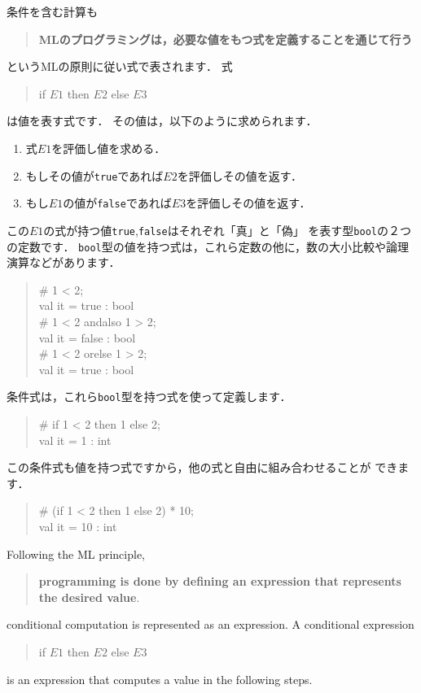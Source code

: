 \documentclass{jbook}
\newif\ifjp
\newenvironment{program}{\begin{quote}\begin{tt}}%
                        {\end{tt}\end{quote}}
\begin{document}
\ifjp%
	条件を含む計算も
\begin{quote}
{\bf MLのプログラミングは，必要な値をもつ式を定義することを通じて行う}
\end{quote}
というMLの原則に従い式で表されます．
	式
\begin{program}
if $E1$ then $E2$ else $E3$
\end{program}
は値を表す式です．
	その値は，以下のように求められます．
\begin{enumerate}
\item 式$E1$を評価し値を求める．
\item もしその値が{\tt true}であれば$E2$を評価しその値を返す．
\item もし$E1$の値が{\tt false}であれば$E3$を評価しその値を返す．
\end{enumerate}
	この$E1$の式が持つ値{\tt true},{\tt false}はそれぞれ「真」と「偽」
を表す型{\tt bool}の２つの定数です．
	{\tt bool}型の値を持つ式は，これら定数の他に，数の大小比較や論理
演算などがあります．
\begin{program}
\# 1 < 2;\\
val it = true : bool\\
\# 1 < 2 andalso 1 > 2;\\
val it = false : bool\\
\# 1 < 2 orelse 1 > 2;\\
val it = true : bool
\end{program}
	条件式は，これら{\tt bool}型を持つ式を使って定義します．
\begin{program}
\# if 1 < 2 then 1 else 2;\\
val it = 1 : int
\end{program}
	この条件式も値を持つ式ですから，他の式と自由に組み合わせることが
できます．
\begin{program}
\# (if 1 < 2 then 1 else 2) * 10;\\
val it = 10 : int
\end{program}
\else%
	Following the ML principle,
\begin{quote}
{\bf programming is done by defining an expression that represents the desired value}.
\end{quote}
conditional computation is represented as an expression.
	A conditional expression
\begin{program}
if $E1$ then $E2$ else $E3$
\end{program}
is an expression that computes a value in the following steps.
\end{document}
